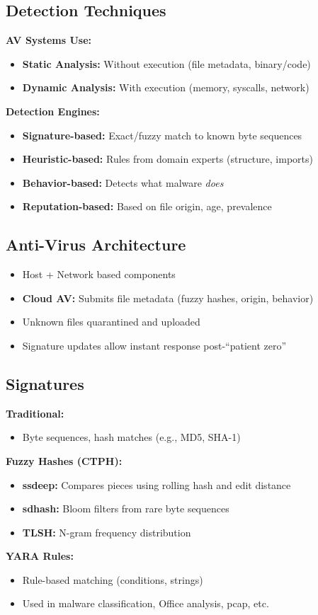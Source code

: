 \subsection{Detection Techniques}
{
\textbf{AV Systems Use:}
\begin{itemize}[noitemsep]
  \item \textbf{Static Analysis:} Without execution (file metadata, binary/code)
  \item \textbf{Dynamic Analysis:} With execution (memory, syscalls, network)
\end{itemize}

\textbf{Detection Engines:}
\begin{itemize}[noitemsep]
  \item \textbf{Signature-based:} Exact/fuzzy match to known byte sequences
  \item \textbf{Heuristic-based:} Rules from domain experts (structure, imports)
  \item \textbf{Behavior-based:} Detects what malware \emph{does}
  \item \textbf{Reputation-based:} Based on file origin, age, prevalence
\end{itemize}
}

\subsection{Anti-Virus Architecture}
{
\begin{itemize}[noitemsep]
  \item Host + Network based components
  \item \textbf{Cloud AV:} Submits file metadata (fuzzy hashes, origin, behavior)
  \item Unknown files quarantined and uploaded
  \item Signature updates allow instant response post-``patient zero''
\end{itemize}
}

\subsection{Signatures}
{
\textbf{Traditional:}
\begin{itemize}[noitemsep]
  \item Byte sequences, hash matches (e.g., MD5, SHA-1)
\end{itemize}

\textbf{Fuzzy Hashes (CTPH):}
\begin{itemize}[noitemsep]
  \item \textbf{ssdeep:} Compares pieces using rolling hash and edit distance
  \item \textbf{sdhash:} Bloom filters from rare byte sequences
  \item \textbf{TLSH:} N-gram frequency distribution
\end{itemize}

\textbf{YARA Rules:}
\begin{itemize}[noitemsep]
  \item Rule-based matching (conditions, strings)
  \item Used in malware classification, Office analysis, pcap, etc.
\end{itemize}
}

